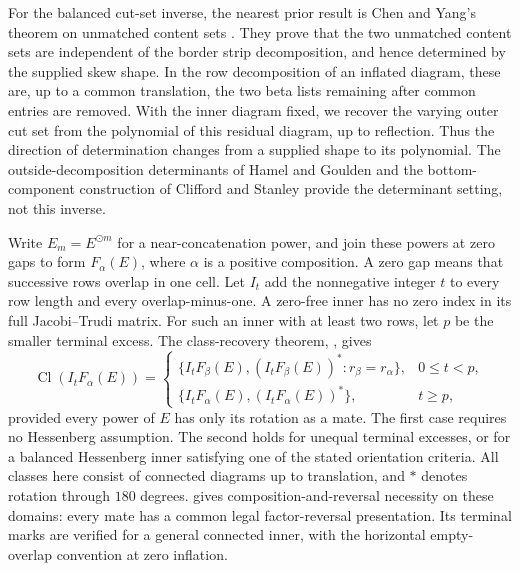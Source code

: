 \documentclass[11pt,a4paper]{amsart}
\numberwithin{equation}{section}
\theoremstyle{plain}
\theoremstyle{definition}
\begin{document}
For the balanced cut-set inverse, the nearest prior result is Chen and Yang's theorem on unmatched content sets \cite[Thm.~3.5]{Chen2008ZrankConjecture}.  They prove that the two unmatched content sets are independent of the border strip decomposition, and hence determined by the supplied skew shape.  In the row decomposition of an inflated diagram, these are, up to a common translation, the two beta lists remaining after common entries are removed.  With the inner diagram fixed, we recover the varying outer cut set from the polynomial of this residual diagram, up to reflection.  Thus the direction of determination changes from a supplied shape to its polynomial.  The outside-decomposition determinants of Hamel and Goulden \cite{Hamel1995PlanarDecompositions} and the bottom-component construction of Clifford and Stanley \cite{Clifford2004BottomSchur} provide the determinant setting, not this inverse.

Write \(E_m=E^{\odot m}\) for a near-concatenation power, and join these powers at zero gaps to form \(F_\alpha(E)\), where \(\alpha\) is a positive composition.  A zero gap means that successive rows overlap in one cell.  Let \(I_t\) add the nonnegative integer \(t\) to every row length and every overlap-minus-one.  A zero-free inner has no zero index in its full Jacobi--Trudi matrix.  For such an inner with at least two rows, let \(p\) be the smaller terminal excess.  The class-recovery theorem, , gives
\[
 \operatorname{Cl}(I_tF_\alpha(E))=
 \begin{cases}
 \{I_tF_\beta(E),(I_tF_\beta(E))^*:r_\beta=r_\alpha\},&0\le t<p,\\
 \{I_tF_\alpha(E),(I_tF_\alpha(E))^*\},&t\ge p,
 \end{cases}
\]
provided every power of \(E\) has only its rotation as a mate.  The first case requires no Hessenberg assumption.  The second holds for unequal terminal excesses, or for a balanced Hessenberg inner satisfying one of the stated orientation criteria.  All classes here consist of connected diagrams up to translation, and \(*\) denotes rotation through \(180\) degrees.   gives composition-and-reversal necessity on these domains: every mate has a common legal factor-reversal presentation.  Its terminal marks are verified for a general connected inner, with the horizontal empty-overlap convention at zero inflation.
\end{document}
